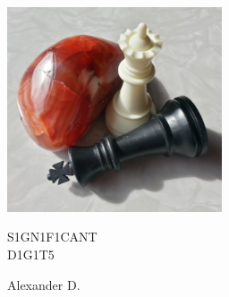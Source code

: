 \thispagestyle{empty}
\begin{center}

\includegraphics[width=2.5in]{titlepic.png}

\vfill

\titlepagefont\HUGE
S1GN1F1CANT\\
\fontsize{48}{48}\selectfont D1G1T5

\vfill

\titlefont

\huge
Alexander D.


\end{center}
\clearpage